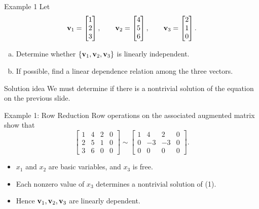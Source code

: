 \begin{frame}{Example 1}
Let
\[
\mathbf{v}_1=\begin{bmatrix}1\\2\\3\end{bmatrix},\qquad
\mathbf{v}_2=\begin{bmatrix}4\\5\\6\end{bmatrix},\qquad
\mathbf{v}_3=\begin{bmatrix}2\\1\\0\end{bmatrix}.
\]\pause
\begin{enumerate}[a.]
\item Determine whether $\{\mathbf{v}_1,\mathbf{v}_2,\mathbf{v}_3\}$ is linearly independent.\pause
\item If possible, find a linear dependence relation among the three vectors.
\end{enumerate}\pause
\begin{block}{Solution idea}
We must determine if there is a nontrivial solution of the equation on the previous slide.
\end{block}
\end{frame}

\begin{frame}{Example 1: Row Reduction}
Row operations on the associated augmented matrix show that\pause
\[
\left[\begin{array}{ccc|c}1&4&2&0\\2&5&1&0\\3&6&0&0\end{array}\right]
\sim
\left[\begin{array}{ccc|c}1&4&2&0\\0&-3&-3&0\\0&0&0&0\end{array}\right].
\]
\begin{itemize}\pause
\item $x_1$ and $x_2$ are basic variables, and $x_3$ is free.\pause
\item Each nonzero value of $x_3$ determines a nontrivial solution of (1).\pause
\item Hence $\mathbf{v}_1,\mathbf{v}_2,\mathbf{v}_3$ are linearly dependent.
\end{itemize}
\end{frame}

